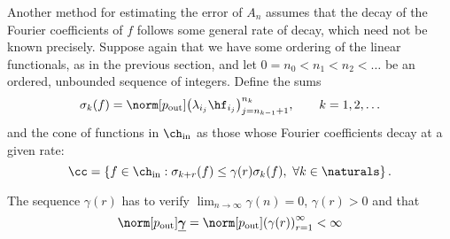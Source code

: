 \documentclass[final]{elsarticle}
\newcommand{\chin}{\ch_{\text{\rm{in}}}}
\newcommand{\pout}{p_{\text{\rm{out}}}}
\newcommand{\bgamma}{\underline{\boldsymbol\gamma}}
\theoremstyle{definition}
\theoremstyle{remark}
\begin{document}
Another method for estimating the error of $A_n$ assumes that the decay of the Fourier coefficients of $f$ follows some general rate of decay, which need not be known precisely.  Suppose again that we have some ordering of the linear functionals, as in the previous section, and let $0=n_0 < n_1 < n_2 < \ldots$ be an ordered, unbounded sequence of integers.  Define the sums
\begin{equation} \label{sumdef}
\sigma_k(f) = \norm[\pout]{ \left(\lambda_{i_j} \hf_{i_j} \right)_{j=n_{k-1}+1}^{n_k}}, \qquad k=1, 2, \ldots
\end{equation}
and the cone of functions in $\chin$ as those whose Fourier coefficients decay at a given rate:
\begin{equation} \label{decayconedef}
\cc = \left\{ f \in \chin : \sigma_{k+r}(f) \le \gamma(r) \sigma_k (f), \ \forall k \in \naturals \right\}.
\end{equation}

The sequence $\gamma(r)$ has to verify $\lim_{n\rightarrow\infty}\gamma(n)=0$, $\gamma(r) > 0$ and that
\begin{equation} \label{constcone}
\norm[\pout]{\bgamma}=\norm[\pout]{ \left(\gamma(r)\right)_{r=1}^\infty}<\infty
\end{equation}
\end{document}

